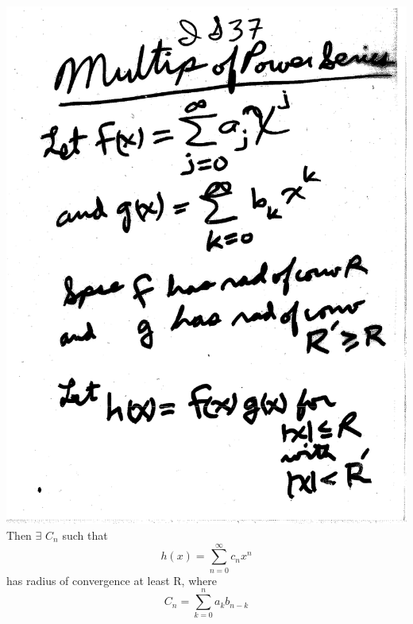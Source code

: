 \documentclass[10pt,a4paper]{article}
\begin{document}
{{\\\includegraphics[scale=0.5]{Pages/InfiniteSeries_37.pdf}
\pagebreak
\\Then $\exists$ $C_{n}$ such that $$h(x)= \sum_{n=0}^{\infty}c_{n}x^{n}$$ has radius of convergence at least R, where $$C_{n}=\sum_{k=0}^{n} a_{k} b_{n-k}$$
}}
\end{document}
